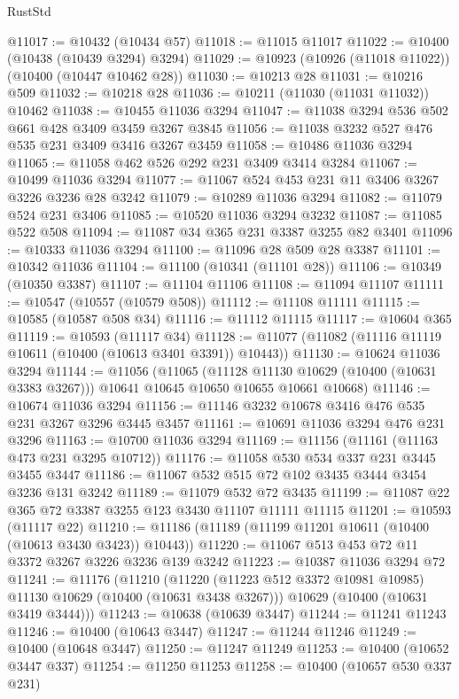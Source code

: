 \begin{lexlean}{RustStd}
\begin{coremodule}
{\begin{coremodule}
{{{{{{{{{{{{{{{{{{{{{{{{{@11017 := @10432 (@10434 @57)
@11018 := @11015 @11017
@11022 := @10400 (@10438 (@10439 @3294) @3294)
@11029 := @10923 (@10926 (@11018 @11022)) (@10400 (@10447 @10462 @28))
@11030 := @10213 @28
@11031 := @10216 @509
@11032 := @10218 @28
@11036 := @10211 (@11030 (@11031 @11032)) @10462
@11038 := @10455 @11036 @3294
@11047 := @11038 @3294 @536 @502 @661 @428 @3409 @3459 @3267 @3845
@11056 := @11038 @3232 @527 @476 @535 @231 @3409 @3416 @3267 @3459
@11058 := @10486 @11036 @3294
@11065 := @11058 @462 @526 @292 @231 @3409 @3414 @3284
@11067 := @10499 @11036 @3294
@11077 := @11067 @524 @453 @231 @11 @3406 @3267 @3226 @3236 @28 @3242
@11079 := @10289 @11036 @3294
@11082 := @11079 @524 @231 @3406
@11085 := @10520 @11036 @3294 @3232
@11087 := @11085 @522 @508
@11094 := @11087 @34 @365 @231 @3387 @3255 @82 @3401
@11096 := @10333 @11036 @3294
@11100 := @11096 @28 @509 @28 @3387
@11101 := @10342 @11036
@11104 := @11100 (@10341 (@11101 @28))
@11106 := @10349 (@10350 @3387)
@11107 := @11104 @11106
@11108 := @11094 @11107
@11111 := @10547 (@10557 (@10579 @508))
@11112 := @11108 @11111
@11115 := @10585 (@10587 @508 @34)
@11116 := @11112 @11115
@11117 := @10604 @365
@11119 := @10593 (@11117 @34)
@11128 := @11077 (@11082 (@11116 @11119 @10611 (@10400 (@10613 @3401 @3391)) @10443))
@11130 := @10624 @11036 @3294
@11144 := @11056
    (@11065
      (@11128 @11130 @10629 (@10400 (@10631 @3383 @3267)))
      @10641
      @10645
      @10650
      @10655
      @10661
      @10668)
@11146 := @10674 @11036 @3294
@11156 := @11146 @3232 @10678 @3416 @476 @535 @231 @3267 @3296 @3445 @3457
@11161 := @10691 @11036 @3294 @476 @231 @3296
@11163 := @10700 @11036 @3294
@11169 := @11156 (@11161 (@11163 @473 @231 @3295 @10712))
@11176 := @11058 @530 @534 @337 @231 @3445 @3455 @3447
@11186 := @11067 @532 @515 @72 @102 @3435 @3444 @3454 @3236 @131 @3242
@11189 := @11079 @532 @72 @3435
@11199 := @11087 @22 @365 @72 @3387 @3255 @123 @3430 @11107 @11111 @11115
@11201 := @10593 (@11117 @22)
@11210 := @11186 (@11189 (@11199 @11201 @10611 (@10400 (@10613 @3430 @3423)) @10443))
@11220 := @11067 @513 @453 @72 @11 @3372 @3267 @3226 @3236 @139 @3242
@11223 := @10387 @11036 @3294 @72
@11241 := @11176
    (@11210
      (@11220 (@11223 @512 @3372 @10981 @10985) @11130 @10629 (@10400 (@10631 @3438 @3267)))
      @10629
      (@10400 (@10631 @3419 @3444)))
@11243 := @10638 (@10639 @3447)
@11244 := @11241 @11243
@11246 := @10400 (@10643 @3447)
@11247 := @11244 @11246
@11249 := @10400 (@10648 @3447)
@11250 := @11247 @11249
@11253 := @10400 (@10652 @3447 @337)
@11254 := @11250 @11253
@11258 := @10400 (@10657 @530 @337 @231)
}}}}}}}}}}}}}}}}}}}}}}}}}
\end{coremodule}}
\end{coremodule}
\end{lexlean}
